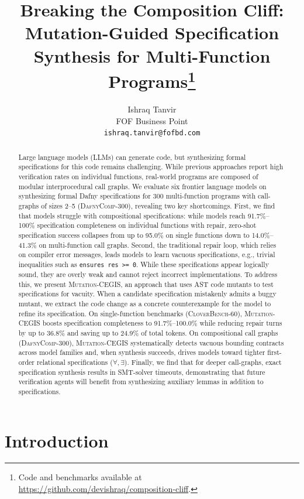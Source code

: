 \documentclass{article}
\title{Breaking the Composition Cliff: Mutation-Guided Specification Synthesis for Multi-Function Programs\thanks{Code and benchmarks available at \url{https://github.com/devishraq/composition-cliff}.}}
\author{%
  Ishraq Tanvir \\
  FOF Business Point \\
  \texttt{ishraq.tanvir@fofbd.com} \\
}
\begin{document}
\maketitle

\begin{abstract}
Large language models (LLMs) can generate code, but synthesizing formal specifications for this code remains challenging. While previous approaches report high verification rates on individual functions, real-world programs are composed of modular interprocedural call graphs. We evaluate six frontier language models on synthesizing formal Dafny specifications for 300 multi-function programs with call-graphs of sizes 2--5 (\textsc{DafnyComp-300}), revealing two key shortcomings. First, we find that models struggle with compositional specifications: while models reach 91.7\%--100\% specification completeness on individual functions with repair, zero-shot specification success collapses from up to 95.0\% on single functions down to 14.0\%--41.3\% on multi-function call graphs. Second, the traditional repair loop, which relies on compiler error messages, leads models to learn vacuous specifications, e.g., trivial inequalities such as \texttt{ensures res >= 0}. While these specifications appear logically sound, they are overly weak and cannot reject incorrect implementations. To address this, we present \textsc{Mutation-CEGIS}, an approach that uses AST code mutants to test specifications for vacuity. When a candidate specification mistakenly admits a buggy mutant, we extract the code change as a concrete counterexample for the model to refine its specification. On single-function benchmarks (\textsc{CloverBench-60}), \textsc{Mutation-CEGIS} boosts specification completeness to 91.7\%--100.0\% while reducing repair turns by up to 36.8\% and saving up to 24.9\% of total tokens. On compositional call graphs (\textsc{DafnyComp-300}), \textsc{Mutation-CEGIS} systematically detects vacuous bounding contracts across model families and, when synthesis succeeds, drives models toward tighter first-order relational specifications ($\forall, \exists$). Finally, we find that for deeper call-graphs, exact specification synthesis results in SMT-solver timeouts, demonstrating that future verification agents will benefit from synthesizing auxiliary lemmas in addition to specifications.
\end{abstract}

\section{Introduction}
\label{sec:intro}
\end{document}
